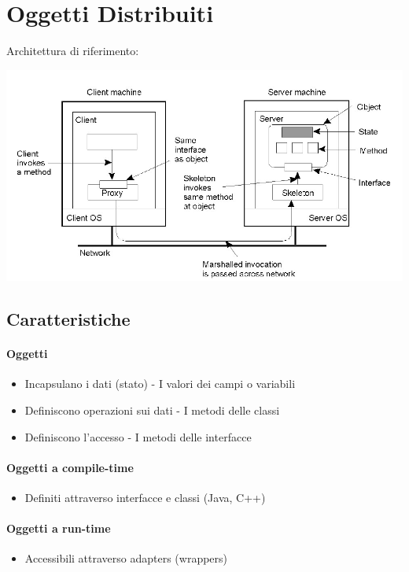 \chapter{Oggetti Distribuiti}
Architettura di riferimento:
\begin{center}
    \includegraphics[scale=0.5]{img/DO_architettura1.jpg}
\end{center}
\section{Caratteristiche}
\subsubsection{Oggetti}
\begin{itemize}
    \item Incapsulano i dati (stato) - I valori dei campi o variabili
    \item Definiscono operazioni sui dati - I metodi delle classi
    \item Definiscono l'accesso - I metodi delle interfacce
\end{itemize}
\subsubsection{Oggetti a compile-time}
\begin{itemize}
    \item Definiti attraverso interfacce e classi (Java, C++)
\end{itemize}
\subsubsection{Oggetti a run-time}
\begin{itemize}
    \item Accessibili attraverso adapters (wrappers)
\end{itemize}
